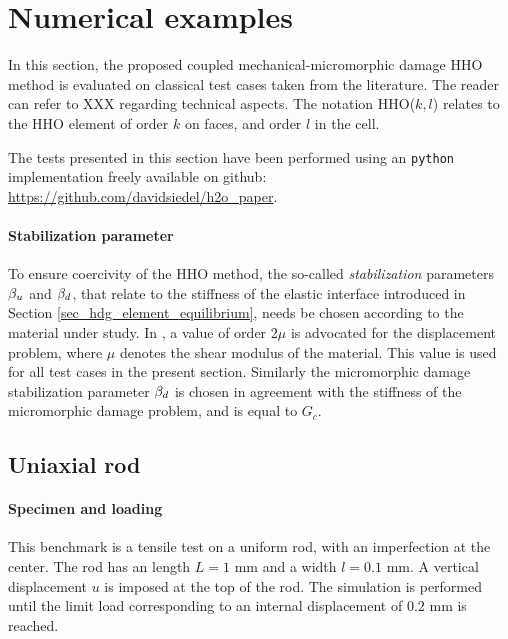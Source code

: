 \section{Numerical examples}

In this section, the proposed coupled mechanical-micromorphic damage HHO method is evaluated on
classical test cases taken from the literature.
The reader can refer to XXX regarding technical aspects. 
The notation
HHO($k,l$) relates to the HHO element of order $k$ on faces, and order $l$ in the
cell.

The tests presented in this section have been performed using an
\texttt{python} implementation freely available on github: \url{https://github.com/davidsiedel/h2o_paper}.

\paragraph{Stabilization parameter}

To ensure coercivity of the HHO method, the so-called \textit{stabilization} parameters
$\beta_{u}$ and $\beta_{d}$, that relate to the stiffness of the elastic interface introduced in Section \ref{sec_hdg_element_equilibrium}, needs be chosen according to the material under study. In \cite{di_pietro_hybrid_2015}, a value of
order $2 \mu$ is advocated for the displacement problem, where $\mu$ denotes the shear modulus of the
material. This value is used for all test cases in the present section. Similarly the micromorphic damage stabilization parameter $\beta_{d}$
is chosen in agreement with the stiffness of the micromorphic damage problem, and is equal to $G_c$.

\subsection{Uniaxial rod}
\label{sec_uniaxial_rod}

\paragraph{Specimen and loading}

This benchmark is a tensile test on a uniform rod, with an imperfection at the center.
The rod has an length $L = 1$ mm and a width $l = 0.1$ mm.
A vertical displacement $u$ is imposed at the top of the rod.
The simulation is performed until the limit load corresponding to an internal displacement of $0.2$ mm is reached.

